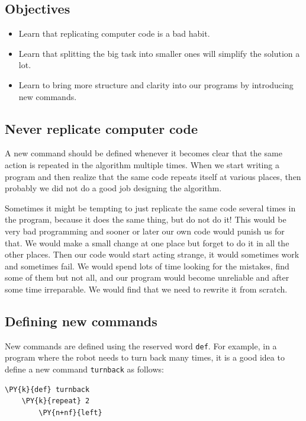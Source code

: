 \subsection{Objectives} 
 
\begin{itemize}
\item Learn that replicating computer code is a bad habit.
\item Learn that splitting the big task into smaller ones will simplify the solution a lot. 
\item Learn to bring more structure and clarity into our programs by introducing new commands.
\end{itemize}

\subsection{Never replicate computer code}

A new command should be defined whenever it becomes clear that the same 
action is repeated in the algorithm multiple times. When we start writing a program and then realize that the same
code repeats itself at various places, then probably we did not do a good job 
designing the algorithm.

Sometimes it might be 
tempting to just replicate the same code several times in the 
program, because it does the same thing, but do not do it! This would be very bad programming
and sooner or later our own code would punish us for that. 
We would make a small change at one place but forget to do it 
in all the other places. Then our code would start 
acting strange, it would sometimes work and sometimes fail. 
We would spend lots of time looking for the mistakes, find some 
of them but not all, and our program would become unreliable
and after some time irreparable. We would find that we need to 
rewrite it from scratch.

\subsection{Defining new commands}

New commands are defined using the reserved word 
{\tt def}. For example, in a program where the robot needs to turn back
many times, it is a good idea to define a new command {\tt turnback}
as follows:\\

\begin{bbox}
\begin{Verbatim}[commandchars=\\\{\}]
\PY{k}{def} turnback
    \PY{k}{repeat} 2
        \PY{n+nf}{left}
\end{Verbatim}
\end{bbox}
\vspace{6mm}

